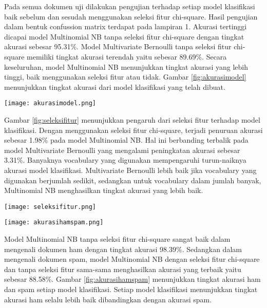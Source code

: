 Pada semua dokumen uji dilakukan pengujian terhadap setiap model klasifikasi baik sebelum dan sesudah menggunakan seleksi fitur chi-square. Hasil pengujian dalam bentuk confussion matrix terdapat pada lampiran 1. Akurasi tertinggi dicapai model Multinomial NB tanpa seleksi fitur chi-square dengan tingkat akurasi sebesar 95.31\%. Model Multivariate Bernoulli tanpa seleksi fitur chi-square memiliki tingkat akurasi terendah yaitu sebesar 89.69\%. Secara keseluruhan, model Multinomial NB menunjukkan tingkat akurasi yang lebih tinggi, baik menggunakan seleksi fitur atau tidak. Gambar \ref{fig:akurasimodel} menunjukkan tingkat akurasi dari model klasifikasi yang telah dibuat.
\begin{figure*}[h!]
	\centering
	\texttt{[image: akurasimodel.png]}
	\caption{Tingkat akurasi setiap model klasifikasi}
	\label{fig:akurasimodel}
\end{figure*}

Gambar \ref{fig:seleksifitur} menunjukkan pengaruh dari seleksi fitur terhadap model klasifikasi. Dengan menggunakan seleksi fitur chi-square, terjadi penuruan akurasi sebesar 1.98\% pada model Multinomial NB. Hal ini berbanding terbalik pada model Multivariate Bernoulli yang mengalami peningkatan akurasi sebesar 3.31\%. Banyaknya vocabulary yang digunakan mempengaruhi turun-naiknya akurasi model klasifikasi. Multivariate Bernoulli lebih baik jika vocabulary yang digunakan berjumlah sedikit, sedangkan untuk vocabulary dalam jumlah banyak, Multinomial NB menghasilkan tingkat akurasi yang lebih baik.
\begin{figure*}[h!]
	\centering
	\texttt{[image: seleksifitur.png]}
	\caption{Pengaruh seleksi fitur terhadap model klasifikasi}
	\label{fig:seleksifitur}
\end{figure*}
\begin{figure*}[h!]
	\centering
	\texttt{[image: akurasihamspam.png]}
	\caption{Tingkat akurasi ham dan spam setiap model klasifikasi}
	\label{fig:akurasihamspam}
\end{figure*}

Model Multinomial NB tanpa seleksi fitur chi-square sangat baik dalam mengenali dokumen ham dengan tingkat akurasi 98.39\%. Sedangkan dalam mengenali dokumen spam, model Multinomial NB dengan seleksi fitur chi-square dan tanpa seleksi fitur sama-sama menghasilkan akurasi yang terbaik yaitu sebesar 88.58\%. Gambar \ref{fig:akurasihamspam} menunjukkan tingkat akurasi ham dan spam setiap model klasifikasi. Setiap model klasifikasi menunjukkan tingkat akurasi ham selalu lebih baik dibandingkan dengan akurasi spam.

